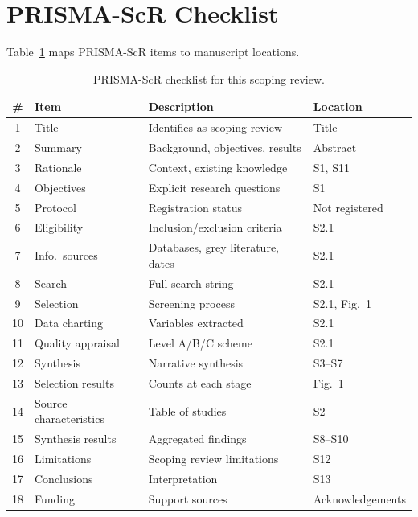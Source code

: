\documentclass[preprint,12pt]{elsarticle}
\begin{document}
\appendix
\section{PRISMA-ScR Checklist}
\label{app:prisma}

Table~\ref{tab:prisma} maps PRISMA-ScR items to manuscript locations.

\begin{table}[htbp]
\centering
\caption{PRISMA-ScR checklist for this scoping review.}
\label{tab:prisma}
\scriptsize
\setlength{\tabcolsep}{2pt}
\renewcommand{\arraystretch}{0.72}
\begin{tabular}{@{}clll@{}}
\toprule
\textbf{\#} & \textbf{Item} & \textbf{Description} & \textbf{Location} \\
\midrule
1  & Title        & Identifies as scoping review & Title \\
2  & Summary      & Background, objectives, results & Abstract \\
3  & Rationale    & Context, existing knowledge & S1, S11 \\
4  & Objectives   & Explicit research questions & S1 \\
5  & Protocol     & Registration status & Not registered \\
6  & Eligibility  & Inclusion/exclusion criteria & S2.1 \\
7  & Info.\ sources & Databases, grey literature, dates & S2.1 \\
8  & Search       & Full search string & S2.1 \\
9  & Selection    & Screening process & S2.1, Fig.~1 \\
10 & Data charting & Variables extracted & S2.1 \\
11 & Quality appraisal & Level A/B/C scheme & S2.1 \\
12 & Synthesis    & Narrative synthesis & S3--S7 \\
13 & Selection results & Counts at each stage & Fig.~1 \\
14 & Source characteristics & Table of studies & S2 \\
15 & Synthesis results & Aggregated findings & S8--S10 \\
16 & Limitations  & Scoping review limitations & S12 \\
17 & Conclusions  & Interpretation & S13 \\
18 & Funding      & Support sources & Acknowledgements \\
\bottomrule
\end{tabular}
\end{table}



\end{document}
